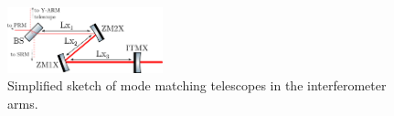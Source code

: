 \begin{figure}[thbp]
\centering
\includegraphics[width=0.4\textwidth]{Detector/Optics/OpticalLayout/OpticalLayoutFigures/telescope_drawing.pdf}
\caption{Simplified sketch of mode matching telescopes in the interferometer
arms.
}
\label{Fig:mode_matching_telescope}
\end{figure}

